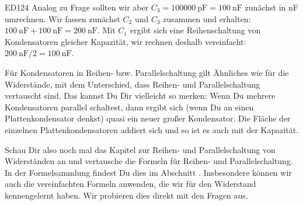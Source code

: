 \begin{sol}{ED124} 
  Analog zu Frage  sollten wir aber $C_3= \SI{100000}{\pico\farad} = \SI{100}{\nano\farad}$ zunächst in \si{\nano\farad} umrechnen.
Wir fassen zunächst $C_2$ und $C_3$ zusammen und erhalten: $\SI{100}{\nano\farad} + \SI{100}{\nano\farad} = \SI{200}{\nano\farad}$. 
Mit $C_1$ ergibt sich eine Reihenschaltung von Kondensatoren gleicher Kapazität, wir rechnen deshalb vereinfacht:
 $\SI{200}{\nano\farad} / 2 = \SI{100}{\nano\farad}$.
\end{sol}


\begin{ohmchapter}
  Für Kondensatoren in Reihen- bzw. Parallelschaltung gilt Ähnliches wie für die Widerstände, mit dem Unterschied, dass Reihen- und Parallelschaltung vertauscht sind. Das kannst Du Dir vielleicht so merken: Wenn Du mehrere Kondensatoren parallel schaltest, dann ergibt sich (wenn Du an einen Plattenkondensator denkst) quasi ein neuer großer Kondensator. Die Fläche der einzelnen Plattenkondensatoren addiert sich und so ist es auch mit der Kapazität.
  
  Schau Dir also noch mal das Kapitel zur Reihen- und Parallelschaltung von Widerständen an und vertausche die Formeln für Reihen- und Parallelschaltung. In der Formelsammlung findest Du dies im Abschnitt . Insbesondere können wir auch die vereinfachten Formeln anwenden, die wir für den Widerstand kennengelernt haben.
  Wir probieren dies direkt mit den Fragen aus.
\end{ohmchapter}